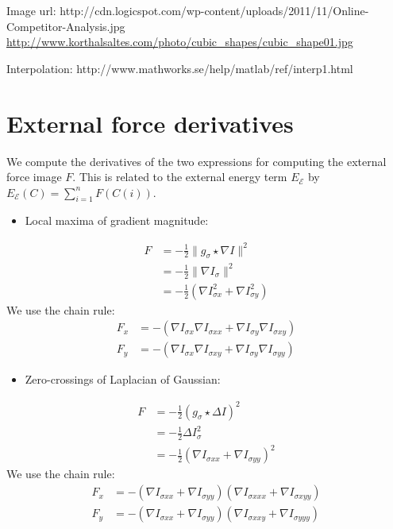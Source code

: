 \documentclass[11pt,a4paper]{article}
\title{}
\author{Malte Stær Nissen}
\begin{document}
\maketitle

Image url: http://cdn.logicspot.com/wp-content/uploads/2011/11/Online-Competitor-Analysis.jpg
\url{http://www.korthalsaltes.com/photo/cubic_shapes/cubic_shape01.jpg}

Interpolation: http://www.mathworks.se/help/matlab/ref/interp1.html

\section{External force derivatives}
%
We compute the derivatives of the two expressions for computing the external force image $F$. This is related to the external energy term $E_\mathcal{E}$ by $E_\mathcal{E}(C) = \sum_{i=1}^n F(C(i))$.
\begin{itemize}
\item Local maxima of gradient magnitude:
\end{itemize}
%
\begin{align}
F &= - \frac12 \| g_\sigma \star \nabla I \|^2 \\
&= - \frac12 \| \nabla I_{\sigma} \|^2 \\
&= - \frac12 (\nabla I_{\sigma x}^2 + \nabla I_{\sigma y}^2)
\end{align}
%
We use the chain rule:
%
\begin{align}
F_x &= - (\nabla I_{\sigma x} \nabla I_{\sigma xx} + \nabla I_{\sigma y} \nabla I_{\sigma xy}) \\
F_y &= - (\nabla I_{\sigma x} \nabla I_{\sigma xy} + \nabla I_{\sigma y} \nabla I_{\sigma yy})
\end{align}
%
\begin{itemize}
\item Zero-crossings of Laplacian of Gaussian:
\end{itemize}
%
\begin{align}
F &= - \frac12 ( g_\sigma \star \Delta I)^2 \\
&= - \frac12 \Delta I_{\sigma}^2 \\
&= - \frac12 (\nabla I_{\sigma xx} + \nabla I_{\sigma yy})^2
\end{align}
%
We use the chain rule:
%
\begin{align}
F_x &= - (\nabla I_{\sigma xx} + \nabla I_{\sigma yy}) (\nabla I_{\sigma xxx} + \nabla I_{\sigma xyy}) \\
F_y &= - (\nabla I_{\sigma xx} + \nabla I_{\sigma yy}) (\nabla I_{\sigma xxy} + \nabla I_{\sigma yyy})
\end{align}
%
\end{document}
